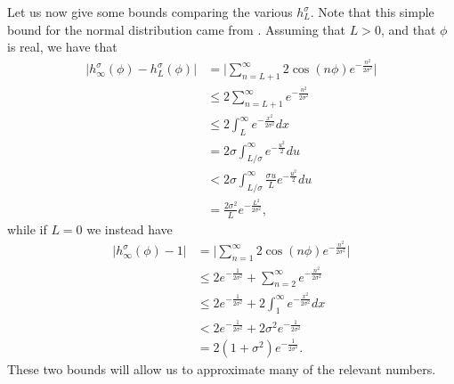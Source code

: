 \documentclass[../thesis-main/thesis-main]{subfiles}
\begin{document}
Let us now give some bounds comparing the various $h_L^\sigma$.  Note that this simple bound for the normal distribution came from \cite{Cook09}.  Assuming that $L > 0$, and that $\phi$ is real, we have that
\begin{align}
  \big|h_{\infty}^{\sigma}(\phi) - h_{L}^{\sigma}(\phi) \big| &= \Big| \sum_{n=L+1}^\infty 2 \cos (n\phi) e^{- \frac{n^2}{2\sigma^2}}\Big|\\
   &\leq 2 \sum_{n = L+1}^\infty e^{ -\frac{n^2}{2\sigma^2}}\\ 
   &\leq 2 \int_{L}^\infty e^{- \frac{x^2}{2\sigma^2}} dx\\
   &= 2 \sigma \int_{L/\sigma}^\infty e^{- \frac{u^2}{2}}{du}\\
   &< 2 \sigma \int_{L/\sigma}^\infty \frac{\sigma u}{L} e^{-\frac{u^2}{2}} du\\
   &= \frac{2 \sigma^2}{L} e^{- \frac{L^2}{2\sigma^2}}\label{eq:hL_bound},
\end{align}
while if $L = 0$ we instead have
\begin{align}
  \big|h_{\infty}^{\sigma}(\phi) - 1 \big| &= \Big| \sum_{n=1}^\infty 2 \cos (n\phi) e^{- \frac{n^2}{2\sigma^2}}\Big|\\
   &\leq 2e^{- \frac{1}{2\sigma^2}} +  \sum_{n = 2}^\infty e^{ -\frac{n^2}{2\sigma^2}}\\ 
   &\leq 2e^{- \frac{1}{2\sigma^2}} + 2 \int_{1}^\infty e^{- \frac{x^2}{2\sigma^2}} dx\\
   &< 2 e^{- \frac{1}{2\sigma^2}} +  2\sigma^2 e^{-\frac{1}{2\sigma^2}}\\
   &= 2(1+ \sigma^2) e^{-\frac{1}{2\sigma^2}}.
\end{align}
These two bounds will allow us to approximate many of the relevant numbers.  
\end{document}
